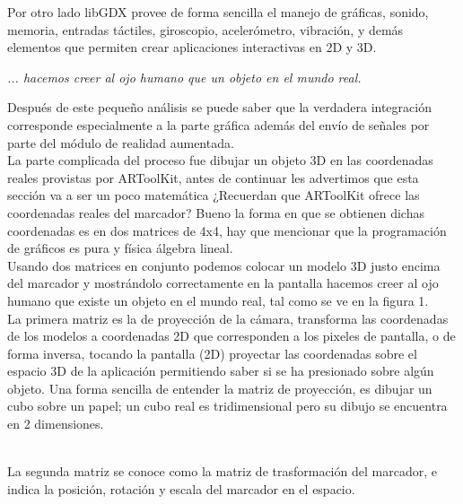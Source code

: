 \begin{multicols}{2}
Por otro lado libGDX provee de forma sencilla el manejo de gráficas, sonido, memoria, entradas táctiles, giroscopio, acelerómetro, vibración, y demás elementos que permiten crear aplicaciones interactivas en 2D y 3D.

\begin{entradilla}
{\em ... hacemos creer al ojo humano que {\color{introcolor}{existe}} un objeto en el mundo real.} 
\end{entradilla}

Después de este pequeño análisis se puede saber que la verdadera integración corresponde especialmente a la parte gráfica además del envío de señales por parte del módulo de realidad aumentada. 
\\

La parte complicada del proceso fue dibujar un objeto 3D en las coordenadas reales provistas por ARToolKit, antes de continuar les advertimos que esta sección va a ser un poco matemática ¿Recuerdan que ARToolKit ofrece las coordenadas reales del marcador? Bueno la forma en que se obtienen dichas coordenadas es en dos  matrices de 4x4, hay que mencionar que la programación de gráficos es pura y física álgebra lineal. 
\\

Usando dos matrices en conjunto podemos colocar un modelo 3D justo encima del marcador y mostrándolo correctamente en la pantalla hacemos creer al ojo humano que existe un objeto en el mundo real, tal como se ve en la figura 1. 
\\

La primera matriz es la de proyección de la cámara, transforma las coordenadas de los modelos a coordenadas 2D que corresponden a los pixeles de pantalla, o de forma inversa, tocando la pantalla (2D) proyectar las coordenadas sobre el espacio 3D de la aplicación permitiendo saber si se ha presionado sobre algún objeto. Una forma sencilla de entender la matriz de proyección, es dibujar un cubo sobre un papel; un cubo real es tridimensional pero su dibujo se encuentra en 2 dimensiones.
\\


\\

La segunda matriz se conoce como la matriz de trasformación del marcador, e indica la posición, rotación y escala del marcador en el espacio.


\end{multicols}
